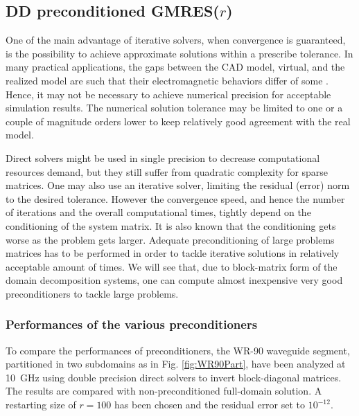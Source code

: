 \subsection{\texorpdfstring{DD preconditioned GMRES($r$)}{DD preconditioned GMRES(r)}}

One of the main advantage of iterative solvers, when convergence is guaranteed, is the possibility to achieve approximate solutions within a prescribe tolerance. In many practical applications, the gaps between the CAD model, virtual, and the realized model are such that their electromagnetic behaviors differ of some . Hence, it may not be necessary to achieve numerical precision for acceptable simulation results. The numerical solution tolerance may be limited to one or a couple of magnitude orders lower to keep relatively good agreement with the real model.

Direct solvers might be used in single precision to decrease computational resources demand, but they still suffer from quadratic complexity for sparse matrices. One may also use an iterative solver, limiting the residual (error) norm to the desired tolerance. However the convergence speed, and hence the number of iterations and the overall computational times, tightly depend on the conditioning of the system matrix. It is also known that the conditioning gets worse as the problem gets larger. Adequate preconditioning of large problems matrices has to be performed in order to tackle iterative solutions in relatively acceptable amount of times. We will see that, due to block-matrix form of the domain decomposition systems, one can compute almost inexpensive very good preconditioners to tackle large problems.

\subsubsection{Performances of the various preconditioners}

To compare the performances of preconditioners, the WR-90 waveguide segment, partitioned in two subdomains as in Fig. \ref{fig:WR90Part}, have been analyzed at 10~GHz using double precision direct solvers to invert block-diagonal matrices. The results are compared with non-preconditioned full-domain solution. A restarting size of $r=100$ has been chosen and the residual error set to $10^{-12}$. 

